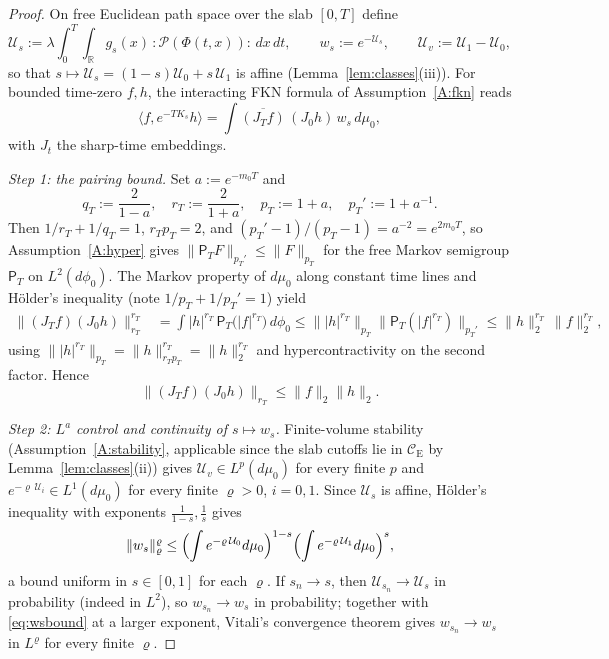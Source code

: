 \documentclass[11pt,a4paper]{article}
\theoremstyle{plain}
\theoremstyle{definition}
\theoremstyle{plain}
\theoremstyle{definition}
\newcommand{\R}{\mathbb{R}}
\newcommand{\CE}{\mathcal{C}_{\mathrm E}}
\newcommand{\ip}[2]{\langle #1,#2\rangle}
\begin{document}
\begin{proof}
On free Euclidean path space over the slab $[0,T]$ define
\[
 \mathcal U_s:=\lambda\int_0^T\!\!\int_\R g_s(x)\,{:}\mathscr P(\Phi(t,x)){:}\,dx\,dt,
 \qquad w_s:=e^{-\mathcal U_s},\qquad
 \mathcal U_v:=\mathcal U_1-\mathcal U_0 ,
\]
so that $s\mapsto\mathcal U_s=(1-s)\mathcal U_0+s\,\mathcal U_1$ is affine
(Lemma~\ref{lem:classes}(iii)). For bounded time-zero $f,h$, the interacting FKN formula of
Assumption~\ref{A:fkn} reads
\begin{equation}
 \ip{f}{e^{-TK_s}h}=\int\overline{(J_Tf)}\,(J_0h)\,w_s\,d\mu_0 ,
 \label{eq:fknpath}
\end{equation}
with $J_t$ the sharp-time embeddings.

\emph{Step 1: the pairing bound.} Set $a:=e^{-m_0T}$ and
\[
 q_T:=\frac2{1-a},\quad r_T:=\frac2{1+a},\quad p_T:=1+a,\quad p_T':=1+a^{-1} .
\]
Then $1/r_T+1/q_T=1$, $r_Tp_T=2$, and $(p_T'-1)/(p_T-1)=a^{-2}=e^{2m_0T}$, so
Assumption~\ref{A:hyper} gives $\|\mathsf P_TF\|_{p_T'}\le\|F\|_{p_T}$ for the free Markov
semigroup $\mathsf P_T$ on $L^2(d\phi_0)$. The Markov property of $d\mu_0$ along constant
time lines and H\"older's inequality (note $1/p_T+1/p_T'=1$) yield
\begin{align*}
 \|(J_Tf)(J_0h)\|_{r_T}^{r_T}
 &=\int |h|^{r_T}\,\mathsf P_T\bigl(|f|^{r_T}\bigr)\,d\phi_0
 \le\bigl\||h|^{r_T}\bigr\|_{p_T}\bigl\|\mathsf P_T(|f|^{r_T})\bigr\|_{p_T'}
 \le\|h\|_2^{r_T}\,\|f\|_2^{r_T},
\end{align*}
using $\||h|^{r_T}\|_{p_T}=\|h\|_{r_Tp_T}^{r_T}=\|h\|_2^{r_T}$ and hypercontractivity on
the second factor. Hence
\begin{equation}
 \|(J_Tf)(J_0h)\|_{r_T}\le\|f\|_2\|h\|_2 .
 \label{eq:pairing}
\end{equation}

\emph{Step 2: $L^a$ control and continuity of $s\mapsto w_s$.} Finite-volume stability
(Assumption~\ref{A:stability}, applicable since the slab cutoffs lie in $\CE$ by
Lemma~\ref{lem:classes}(ii)) gives $\mathcal U_v\in L^p(d\mu_0)$ for every finite $p$ and
$e^{-\varrho\,\mathcal U_i}\in L^1(d\mu_0)$ for every finite $\varrho>0$, $i=0,1$. Since
$\mathcal U_s$ is affine, H\"older's inequality with exponents
$\frac1{1-s},\frac1s$ gives
\begin{equation}
 \|w_s\|_\varrho^\varrho\le
 \Bigl(\int e^{-\varrho\,\mathcal U_0}d\mu_0\Bigr)^{1-s}
 \Bigl(\int e^{-\varrho\,\mathcal U_1}d\mu_0\Bigr)^{s} ,
 \label{eq:wsbound}
\end{equation}
a bound uniform in $s\in[0,1]$ for each $\varrho$. If $s_n\to s$, then
$\mathcal U_{s_n}\to\mathcal U_s$ in probability (indeed in $L^2$), so
$w_{s_n}\to w_s$ in probability; together with \eqref{eq:wsbound} at a larger exponent,
Vitali's convergence theorem gives $w_{s_n}\to w_s$ in $L^\varrho$ for every finite
$\varrho$.


\end{proof}
\end{document}
